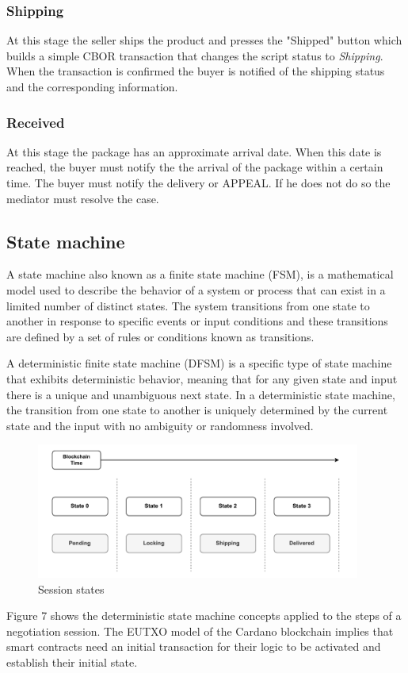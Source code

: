 \documentclass[12pt]{article}
\begin{document}
\subsubsection { Shipping }

At this stage the seller ships the product and presses the "Shipped" button which builds a simple CBOR transaction that changes the script status to \emph{Shipping}. When the transaction is confirmed the buyer is notified of the shipping status and the corresponding information.

\subsubsection { Received }

At this stage the package has an approximate arrival date. When this date is reached, the buyer must notify the  the arrival of the package within a certain time. The buyer must notify the delivery or APPEAL. If he does not do so the mediator must resolve the case.

\subsection { State machine }
A state machine also known as a finite state machine (FSM), is a mathematical model used to describe the behavior of a system or process that can exist in a limited number of distinct states. The system transitions from one state to another in response to specific events or input conditions and these transitions are defined by a set of rules or conditions known as transitions.

A deterministic finite state machine (DFSM) is a specific type of state machine that exhibits deterministic behavior, meaning that for any given state and input there is a unique and unambiguous next state. In a deterministic state machine, the transition from one state to another is uniquely determined by the current state and the input with no ambiguity or randomness involved.

\begin{figure}[ht]
  \centering
  \includegraphics[width=0.95\textwidth]{machine.pdf}
  \caption{Session states}
  \label{fig:States}
\end{figure}
Figure 7 shows the deterministic state machine concepts applied to the steps of a negotiation session. 
The EUTXO model of the Cardano blockchain implies that smart contracts need an initial transaction for their logic to be activated and establish their initial state.
\end{document}
